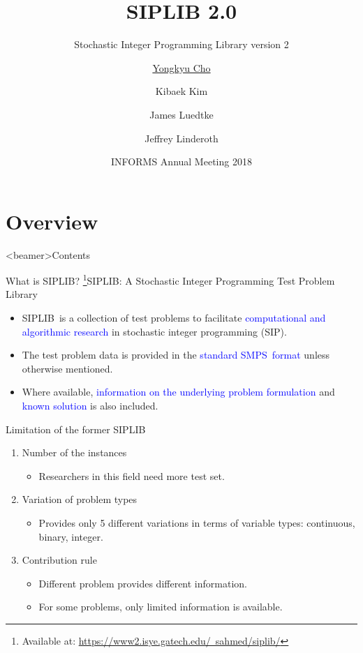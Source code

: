 \documentclass{beamer}
\title{\textbf{SIPLIB 2.0}}
\subtitle{Stochastic Integer Programming Library version 2}
\author{\underline{Yongkyu Cho}\inst{1}\inst{2} \and Kibaek Kim\inst{2} \\ \and James Luedtke\inst{3} \and Jeffrey Linderoth\inst{3}}
\institute[] %
{
	\inst{1}%
	Department of Industrial and Management Engineering\\
	Pohang University of Science and Technology
	\and
	\inst{2}%
	Mathematics and Computer Science Division\\
	Argonne National Laboratory
	\and
	\inst{3}%
	Department of Industrial and Systems Engineering\\
	University of Wisconsin-Madison
}
\date{INFORMS Annual Meeting 2018}
\newcommand{\siplib}{\textsf{SIPLIB}}
\newcommand{\smps}{\textsf{SMPS}}
\begin{document}
	
	
	\begin{frame}
	\titlepage
\end{frame}


\section{Overview}
\begin{frame}<beamer>{Contents}
\end{frame}	

\begin{frame}{What is \siplib?}
\footnote{\tiny Available at: \href{https://www2.isye.gatech.edu/~sahmed/siplib/}{https://www2.isye.gatech.edu/~sahmed/siplib/}}{\siplib}: A Stochastic Integer Programming Test Problem Library
\begin{itemize}
\item \siplib\ is a collection of test problems to facilitate \textcolor{blue}{computational and algorithmic research} in stochastic integer programming (SIP).
\item The test problem data is provided in the \textcolor{blue}{standard \smps\ format} unless otherwise mentioned.
\item Where available, \textcolor{blue}{information on the underlying problem formulation} and \textcolor{blue}{known solution} is also included.
\end{itemize}
\end{frame}

\begin{frame}{Limitation of the former \siplib}
\begin{enumerate}
\item Number of the instances
\begin{itemize}
\item Researchers in this field need more test set.
\end{itemize}
\item Variation of problem types
\begin{itemize}
\item Provides only 5 different variations in terms of variable types: continuous, binary, integer.
\end{itemize}
\item Contribution rule
\begin{itemize}
\item Different problem provides different information.
\item For some problems, only limited information is available.
\end{itemize}
\end{enumerate}
\end{frame}
\end{document}
